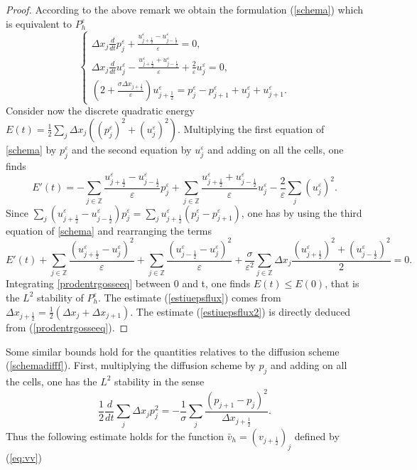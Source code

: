 \documentclass[a4paper,french,english,10pt]{article}
\newcommand\eps{\varepsilon}
\begin{document}
\begin{proof}
According to the above remark we obtain  
the formulation 
(\ref{schema}) 
which is 
equivalent to $P_h^\eps$
\begin{equation}\label{schema}
\left\{
\begin{array}{lll}
\displaystyle\Delta x_j\frac{d}{dt}p^{\eps}_j +\frac{u_{j+\frac12 }^{\eps} -
u_{j-\frac12 }^{\eps} }{\eps} = 0,\\
\displaystyle\Delta x_j\frac{d}{dt}u^{\eps}_j-\frac{u_{j+\frac12 }^{\eps}+
u_{j-\frac12 }^{\eps}}{\eps} +\frac{2}{\eps}u_j^{\eps}=0, \\
\displaystyle 
\left( 2
+\frac{\sigma \Delta x_{j+\frac12}
 }{\eps}
\right) u_{j+\frac12 }^{\eps} 

=p^{\eps}_j-p^{\eps}_{j+1}+u^{\eps}_j+u^{\eps}_{j+1}
.
\end{array}
\right.
\end{equation}
Consider now the discrete quadratic energy
$E(t)=\frac12 \sum_j \Delta x_j ((p^{\eps}_j)^2+(u^{\eps}_j)^2)$.
 Multiplying the first equation of \eqref{schema} by $p_j^{\eps}$ and the second
equation by $u_j^{\eps}$ and adding on all the cells, one finds
\begin{equation*}
 E'(t)=-\sum_{j\in \mathbb{Z}} \frac{
u_{j+\frac12 }^{\eps}-u_{j-\frac12 }^{\eps}}{\eps}p^{\eps}_j + \sum_{j\in
\mathbb{Z}} \frac{
u_{j+\frac12 }^{\eps}+u_{j-\frac12 }^{\eps}}{\eps}u^{\eps}_j
-\frac{2}{\eps}\sum_j (u^{\eps}_j)^2.
\end{equation*}
Since $
\sum_{j}(
u_{j+\frac12 }^{\eps}-u_{j-\frac12 }^{\eps})p^{\eps}_j =
\sum_{j} u_{j+\frac12 }^{\eps}(p^{\eps}_j-p^{\eps}_{j+1})$, one
has  by using the third equation of \eqref{schema} and rearranging the
terms
\begin{equation}\label{prodentrgosseeq}
E'(t)+\sum_{j\in \mathbb{Z}} \frac{
(u_{j+\frac12 }^{\eps}-u^{\eps}_j)^2 }{\eps}+\sum_{j\in \mathbb{Z}} \frac{
(u_{j-\frac12 }^{\eps}-u^{\eps}_j)^2 }{\eps} +
\frac{\sigma}{\eps^2}\sum_{j\in \mathbb{Z}} \Delta x_{j}
\frac{(u_{j+\frac12 }^{\eps})^2+(u_{j-\frac12 }^{\eps})^2}{2}= 0.
\end{equation}
Integrating  \eqref{prodentrgosseeq} between 0 and t, one finds  $E(t)\leq E(0)$, that is the $L^2$ stability of $P_h^\eps$.
The estimate  (\ref{estiuepsflux}) 
comes from 
$\Delta x_{j+\frac12}=\frac12( \Delta x_{j}+\Delta x_{j+1})$. The estimate 
 (\ref{estiuepsflux2}) is directly deduced from
(\ref{prodentrgosseeq}).
\end{proof}


Some similar bounds hold 
for  the quantities relatives to the diffusion scheme (\ref{schemadifff}).
First, multiplying the diffusion scheme by $p_j$ and adding on all the cells,
one has the $L^2$ stability in the sense
\begin{equation*}
\frac12 \frac{d}{dt}\sum_j \Delta x_jp_j^2=-\frac{1}{\sigma}\sum_j
\frac{(p_{j+1}-p_j)^2}{\Delta x_{j+\frac12 }}.
\end{equation*}
Thus 
the following estimate holds for
 the function 
$\bar{v}_h=\left( v_{j+\frac12}  \right)_j$ defined by
(\ref{eq:vv})  
 
\end{document}
